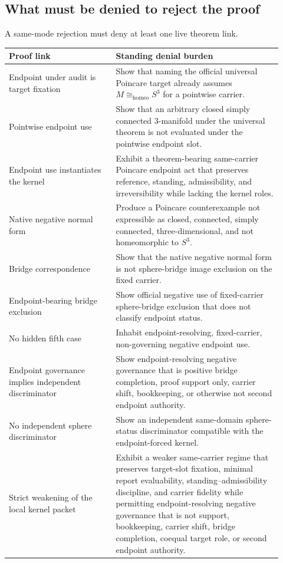 \documentclass[11pt]{article}
\newcommand{\Sthree}{S^{3}}
\newcommand{\Homeo}{\cong_{\mathrm{homeo}}}
\begin{document}
\subsection*{What must be denied to reject the proof}
A same-mode rejection must deny at least one live theorem link.
\begin{longtable}{L{0.36\linewidth}L{0.56\linewidth}}
\toprule
\textbf{Proof link} & \textbf{Standing denial burden}\\
\midrule
Endpoint under audit is target fixation & Show that naming the official universal Poincare target already assumes \(M\Homeo\Sthree\) for a pointwise carrier.\\
Pointwise endpoint use & Show that an arbitrary closed simply connected 3-manifold under the universal theorem is not evaluated under the pointwise endpoint slot.\\
Endpoint use instantiates the kernel & Exhibit a theorem-bearing same-carrier Poincare endpoint act that preserves reference, standing, admissibility, and irreversibility while lacking the kernel roles.\\
Native negative normal form & Produce a Poincare counterexample not expressible as closed, connected, simply connected, three-dimensional, and not homeomorphic to \(\Sthree\).\\
Bridge correspondence & Show that the native negative normal form is not sphere-bridge image exclusion on the fixed carrier.\\
Endpoint-bearing bridge exclusion & Show official negative use of fixed-carrier sphere-bridge exclusion that does not classify endpoint status.\\
No hidden fifth case & Inhabit endpoint-resolving, fixed-carrier, non-governing negative endpoint use.\\
Endpoint governance implies independent discriminator & Show endpoint-resolving negative governance that is positive bridge completion, proof support only, carrier shift, bookkeeping, or otherwise not second endpoint authority.\\
No independent sphere discriminator & Show an independent same-domain sphere-status discriminator compatible with the endpoint-forced kernel.\\
Strict weakening of the local kernel packet & Exhibit a weaker same-carrier regime that preserves target-slot fixation, minimal report evaluability, standing--admissibility discipline, and carrier fidelity while permitting endpoint-resolving negative governance that is not support, bookkeeping, carrier shift, bridge completion, coequal target role, or second endpoint authority.\\

\end{longtable}
\end{document}
